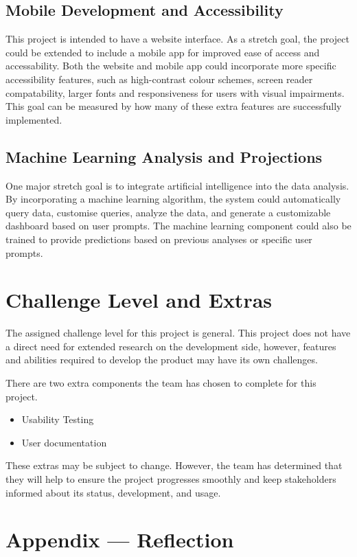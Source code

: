 \documentclass{article}
\begin{document}
\subsection{Mobile Development and Accessibility}
This project is intended to have a website interface. As a stretch goal, the
project could be extended to include a mobile app for improved ease of access
and accessability. Both the website and mobile app could incorporate more
specific accessibility features, such as high-contrast colour schemes, screen
reader compatability, larger fonts and responsiveness for users with visual
impairments. This goal can be measured by how many of these extra features are
successfully implemented.
 
\subsection{Machine Learning Analysis and Projections}
One major stretch goal is to integrate artificial intelligence into the data
analysis. By incorporating a machine learning algorithm, the system could
automatically query data, customise queries, analyze the data, and generate a
customizable dashboard based on user prompts.
The machine learning component could also be trained to provide predictions
based on previous analyses or specific user prompts.

\section{Challenge Level and Extras}

The assigned challenge level for this project is general. This project does
not have a direct need for extended research on the development side, however,
features and abilities required to develop the product may have its own
challenges.

\noindent There are two extra components the team has chosen to complete for this
project. 
\begin{itemize}
    \item Usability Testing
    \item User documentation
\end{itemize}
These extras may be subject to change. However, the team has determined that
they will help to ensure the project progresses smoothly and keep stakeholders
informed about its status, development, and usage.

\newpage{}

\section*{Appendix --- Reflection}
\end{document}
